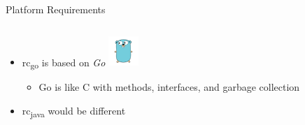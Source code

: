 \documentclass{beamer}
\newcommand{\rcgo}{rc\textsubscript{go}}
\begin{document}
\begin{frame}{Platform Requirements}
  \vspace*{-20pt}

  \begin{columns}
    \begin{column}{.5\textwidth}
      \begin{itemize}
      \item \rcgo{} is based on \emph{Go} \includegraphics[height=32pt]{gopher.png}
        \begin{itemize}
        \item Go is like C with methods, interfaces, and garbage collection
        \end{itemize}
      \item rc\textsubscript{java} would be different
      \end{itemize}
    \end{column}
    \begin{column}{.5\textwidth}
    \end{column}
  \end{columns}


\end{frame}
\end{document}
